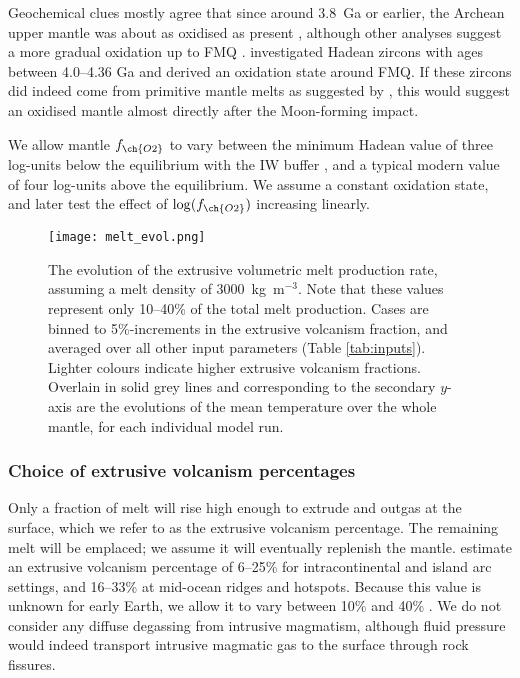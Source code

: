 Geochemical clues mostly agree that since around 3.8~Ga or earlier, the Archean upper mantle was about as oxidised as present \citep{Canil1997, Delano2001, Trail2011, NICKLAS2018, Armstrong2019}, although other analyses suggest a more gradual oxidation up to FMQ \citep{Aulbach2016, NICKLAS2019}. \citet{Trail2011} investigated Hadean zircons with ages between 4.0--4.36 Ga and derived an oxidation state around FMQ. If these zircons did indeed come from primitive mantle melts as suggested by \citet{Trail2011}, this would suggest an oxidised mantle almost directly after the Moon-forming impact. 

We allow mantle $f_{\ch{O2}}$ to vary between the minimum Hadean value of three log-units below the equilibrium with the IW buffer \citep{Wood2006}, and a typical modern value of four log-units above the equilibrium. We assume a constant oxidation state, and later test the effect of $\log(f_{\ch{O2}})$ increasing linearly.


\begin{figure}
    \centering
    \texttt{[image: melt\_evol.png]}
    \caption[Modelled evolution of the extrusive volumetric melt production rate for Archean Earth.]{The evolution of the extrusive volumetric melt production rate, assuming a melt density of 3000~kg~m$^{-3}$. Note that these values represent only 10--40\% of the total melt production. Cases are binned to 5\%-increments in the extrusive volcanism fraction, and averaged over all other input parameters (Table \ref{tab:inputs}). Lighter colours indicate higher extrusive volcanism fractions. Overlain in solid grey lines and corresponding to the secondary $y$-axis are the evolutions of the mean temperature over the whole mantle, for each individual model run.}
    \label{fig:melt_vol}
\end{figure}

\subsubsection{Choice of extrusive volcanism percentages}

Only a fraction of melt will rise high enough to extrude and outgas at the surface, which we refer to as the extrusive volcanism percentage. The remaining melt will be emplaced; we assume it will eventually replenish the mantle. \citet{Crisp1984} estimate an extrusive volcanism percentage of 6--25\% for intracontinental and island arc settings, and 16--33\% at mid-ocean ridges and hotspots. Because this value is unknown for early Earth, we allow it to vary between 10\% and 40\% \citep{Grott2011}. We do not consider any diffuse degassing from intrusive magmatism, although fluid pressure would indeed transport intrusive magmatic gas to the surface through rock fissures.  






